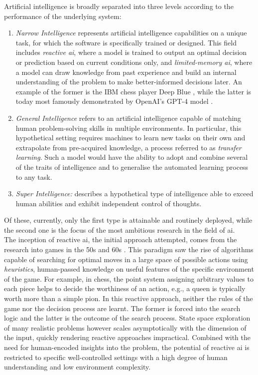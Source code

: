 Artificial intelligence is broadly separated into three levels according to the performance of the underlying system: 
\begin{enumerate}
    \item \textit{Narrow Intelligence} represents artificial intelligence capabilities on a unique task, for which the software is specifically trained or designed. This field includes \textit{reactive \gls{ai}}, where a model is trained to output an optimal decision or prediction based on current conditions only, and \textit{limited-memory \gls{ai}}, where a model can draw knowledge from past experience and build an internal understanding of the problem to make better-informed decisions later. An example of the former is the IBM chess player Deep Blue \cite{CAMPBELL200257}, while the latter is today most famously demonstrated by OpenAI's GPT-4 model \cite{openai2024gpt4}. 
    \item \textit{General Intelligence} refers to an artificial intelligence capable of matching human problem-solving skills in multiple environments. In particular, this hypothetical setting requires machines to learn new tasks on their own and extrapolate from pre-acquired knowledge, a process referred to as \textit{transfer learning}. Such a model would have the ability to adopt and combine several of the traits of intelligence and to generalise the automated learning process to any task.
    \item \textit{Super Intelligence:} describes a hypothetical type of intelligence able to exceed human abilities and exhibit independent control of thoughts. 
\end{enumerate}
Of these, currently, only the first type is attainable and routinely deployed, while the second one is the focus of the most ambitious research in the field of \gls{ai}. \\

The inception of reactive \gls{ai}, the initial approach attempted, comes from the research into games in the 50s and 60s \cite{russel2010}. This paradigm saw the rise of algorithms capable of searching for optimal moves in a large space of possible actions using \textit{heuristics}, human-passed knowledge on useful features of the specific environment of the game. For example, in chess, the point system assigning arbitrary values to each piece helps to decide the worthiness of an action, e.g., a queen is typically worth more than a simple pion. In this reactive approach, neither the rules of the game nor the decision process are learnt. The former is forced into the search logic and the latter is the outcome of the search process. State space exploration of many realistic problems however scales asymptotically with the dimension of the input, quickly rendering reactive approaches impractical. Combined with the need for human-encoded insights into the problem, the potential of reactive \gls{ai} is restricted to specific well-controlled settings with a high degree of human understanding and low environment complexity. \\

